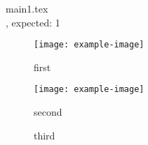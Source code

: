 \documentclass{article}
\begin{document}
{main1.tex}\\
, expected: 1\\


\begin{figure}
  \texttt{[image: example-image]}
  \caption{first}
  \label{fig:first}
\end{figure}

\begin{figure}
  \texttt{[image: example-image]}
  \caption{second}
  \label{fig:second}
\end{figure}

\begin{figure}[h]
  
  \caption{third}
  \label{fig:third}
\end{figure}
\end{document}
